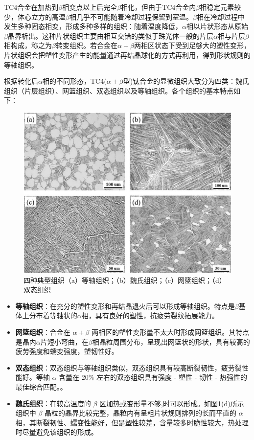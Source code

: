 TC4合金在加热到$ \beta $相变点以上后完全$ \beta $相化，但由于TC4合金内$ \beta $相稳定元素较少，体心立方的高温$\beta$相几乎不可能随着冷却过程保留到室温。$\beta$相在冷却过程中发生多种固态相变，形成多种多样的组织：随着温度降低，$\alpha$相以片状形态从原始$\beta$晶界析出。这种片状组织主要由相互交错的类似于珠光体一般的片层$\alpha$相与片层$\beta$相构成，称之为$\beta$转变组织。若合金在$\alpha+\beta$两相区状态下受到足够大的塑性变形，片状组织会把塑性变形产生的能量通过再结晶球化的方式再利用，得到形状规则的等轴组织。

根据转化后$\alpha$相的不同形态，TC4($\alpha+\beta$型)钛合金的显微组织大致分为四类：魏氏组织（片层组织）、网篮组织、双态组织以及等轴组织。各个组织的基本特点如下：
\begin{figure}[h!]
	\centering
	\includegraphics[width=0.7\linewidth]{pic/四种典型组织}
	\caption{四种典型组织（a）等轴组织；（b）魏氏组织；（c）网篮组织；（d） 双态组织}
	\label{fig:classic}
\end{figure}

\begin{itemize}
	\item 	\textbf{等轴组织}：在充分的塑性变形和再结晶退火后可以形成等轴组织。特点是$ \beta $基体上分布着等轴状的$ \alpha $相，具有良好的塑性，抗疲劳裂纹拓展能力。
	\item 	\textbf{网篮组织}：合金在 $\alpha+\beta$ 两相区的塑性变形量不太大时形成网篮组织。其特点是晶内$ \alpha $片短小弯曲，在$ \beta $相晶粒周围分布，呈现出网篮状的形状，具有较高的疲劳强度和蠕变强度，塑韧性好。
	\item 	\textbf{双态组织}：双态组织与等轴组织类似，双态组织具有较高断裂韧性，疲劳裂性能好。等轴 $\alpha$ 含量在 $20 \%$ 左右的双态组织具有强度 - 塑性 - 韧性 - 热强性的最佳综合匹配。。
	\item 	\textbf{魏氏组织}：在较高温度的 $\beta$ 区加热或变形量不够,时可以形成。如图\ref{fig:classic}(d)所示组织中 $\beta$ 晶粒的晶界比较完整，晶粒内有呈粗片状规则排列的长而平直的 $ \alpha $相，其断裂韧性、蠕变性能好，但是塑性较差，含量较多时脆性较大，热处理时尽量避免该组织的形成。
\end{itemize}

